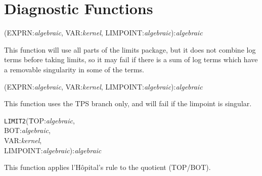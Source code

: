 \section{Diagnostic Functions}

\vspace{.1in}
(EXPRN:{\em algebraic}, VAR:{\em kernel}, LIMPOINT:{\em algebraic}):{\em algebraic}
\vspace{.1in}

This function will use all parts of the limits package, but it does not
combine log terms before taking limits, so it may fail if there is a sum
of log terms which have a removable singularity in some of the terms.

\vspace{.1in}
(EXPRN:{\em algebraic}, VAR:{\em kernel}, LIMPOINT:{\em algebraic}):{\em algebraic}
\vspace{.1in}

This function uses the TPS branch only, and will fail if the limpoint is
singular.

\vspace{.1in}
\begin{tabbing}
{\tt LIMIT2}(\=TOP:{\em algebraic}, \\
\>BOT:{\em algebraic}, \\
\>VAR:{\em kernel}, \\
\>LIMPOINT:{\em algebraic}):{\em algebraic}
\end{tabbing}
\vspace{.1in}

This function applies l'H\^{o}pital's rule to the quotient (TOP/BOT).

